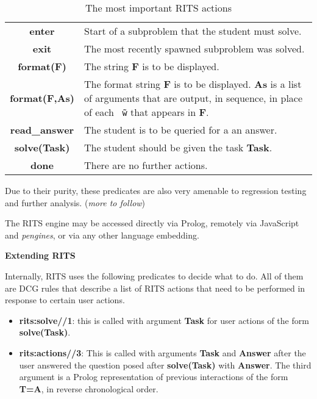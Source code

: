 \documentclass[a4paper,11pt]{article}
\begin{document}
\begin{table}[ht]
  \centering
  \begin{tabular}{cp{7cm}}
    \hline
    \textbf{enter} & Start of a subproblem that the student must solve.\\
    \textbf{exit} & The most recently spawned subproblem was solved.\\
    \textbf{format(F)} & The string \textbf{F} is to be displayed.\\
    \textbf{format(F,As)} & The format string \textbf{F} is to be displayed. \textbf{As} is a list of arguments that are output, in sequence, in place of each \texttt{\~\ $\!\!\!$w} that appears in \textbf{F}.\\
    \textbf{read\_answer} & The student is to be queried for a an answer.\\
    \textbf{solve(Task)} & The student should be given the task \textbf{Task}.\\
    \textbf{done} & There are no further actions.\\
    \hline
  \end{tabular}
\caption{The most important RITS actions}
  \label{tab:ritsactions}
\end{table}


\vspace{0.7cm}

Due to their purity, these predicates are also very amenable to
regression testing and further analysis. (\textit{more to follow})

\vspace{0.7cm}

The RITS engine may be accessed directly via Prolog, remotely via
JavaScript and \textit{pengines}, or via any other language embedding.

\bigskip
\begin{center}
  \large\textbf{Extending RITS}
\end{center}

\medskip
\noindent Internally, RITS uses the following predicates to decide
what to do. All of them are DCG rules that describe a list of RITS
actions that need to be performed in response to certain user actions.

\begin{itemize}
\item \textbf{rits:solve//1}: this is called with argument \textbf{Task}
  for user actions of the form \textbf{solve(Task)}.

\item \textbf{rits:actions//3}: This is called with arguments \textbf{Task}
  and \textbf{Answer} after the user answered the question posed after
  \textbf{solve(Task)} with \textbf{Answer}. The third argument is a
  Prolog representation of previous interactions of the form
  \textbf{T=A}, in reverse chronological order.

\end{itemize}
\end{document}
